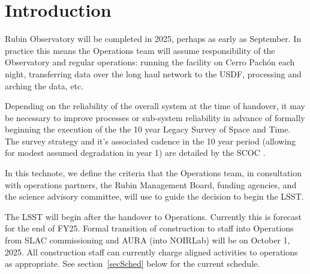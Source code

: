 \section{Introduction}

Rubin Observatory will be completed in 2025, perhaps as early as September. In practice this means the Operations team \cite[see][]{RDO-018} will assume responsibility of the Observatory and regular operations: running the facility on Cerro Pach\'{o}n each night, transferring data over the long haul network to the USDF, processing and arching the data, etc. 

Depending on the reliability of the overall system at the time of handover, it may be necessary to improve processes or sub-system reliability in advance of formally beginning the execution of the the 10 year Legacy Survey of Space and Time. The survey strategy and it's associated cadence in the 10 year period (allowing for modest assumed degradation in year 1) are detailed by the SCOC \cite[]{PSTN-056}. 

In this technote, we define the criteria that the Operations team, in consultation with operations partners, the Rubin Management Board, funding agencies, and the science advisory committee, will use to guide the decision to begin the LSST. 

The LSST will begin after the handover to Operations. Currently this is forecast for the end of FY25. Formal transition of construction to staff into Operations from SLAC commissioning and AURA (into NOIRLab) will be on October 1, 2025. All construction staff can currently charge aligned activities to operations as appropriate. See section~\ref{secSched} below for the current schedule.  

